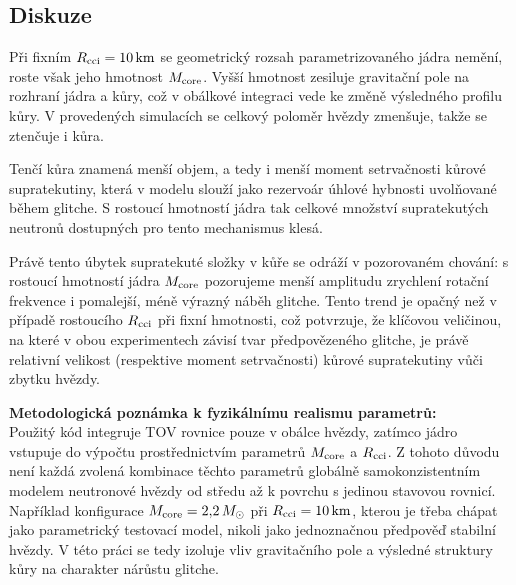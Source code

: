 \documentclass[%
final%
,htext%
]{ipothes}
\begin{document}
\begin{table}[H]
\centering \renewcommand{\arraystretch}{1.4}
\caption{Výsledky simulace ($R_{\rm cci} = 10$~km, proměnné $M_{\rm core}$). Veličiny: $M_{\rm core}$ -- hmotnost jádra; $M_{\rm NS}$, $R_{\rm NS}$ -- celková hmotnost a poloměr hvězdy; $\Delta\nu_{\rm max}$ -- přechodné maximum změny frekvence; $t_{\rm max}$ -- čas dosažení maxima; indexy A, B, C označují zvolený profil tření.}
\label{tab:exp2_mcoeff}
\newsavebox{\tabletwobox}
\sbox{\tabletwobox}{}
\resizebox{\textwidth}{!}{\usebox{\tabletwobox}}
\end{table}


\subsection{Diskuze}

Při fixním $R_{\rm cci} = 10\,\mathrm{km}$ se geometrický rozsah parametrizovaného jádra nemění, roste však jeho hmotnost $M_{\rm core}$. Vyšší hmotnost zesiluje gravitační pole na rozhraní jádra a kůry, což v obálkové integraci vede ke změně výsledného profilu kůry. V provedených simulacích se celkový poloměr hvězdy zmenšuje, takže se ztenčuje i kůra.

Tenčí kůra znamená menší objem, a tedy i menší moment setrvačnosti kůrové supratekutiny, která v modelu slouží jako rezervoár úhlové hybnosti uvolňované během glitche. S rostoucí hmotností jádra tak celkové množství supratekutých neutronů dostupných pro tento mechanismus klesá.

Právě tento úbytek supratekuté složky v kůře se odráží v pozorovaném chování: s rostoucí hmotností jádra $M_{\rm core}$ pozorujeme menší amplitudu zrychlení rotační frekvence i pomalejší, méně výrazný náběh glitche. Tento trend je opačný než v případě rostoucího $R_{\rm cci}$ při fixní hmotnosti, což potvrzuje, že klíčovou veličinou, na které v obou experimentech závisí tvar předpovězeného glitche, je právě relativní velikost (respektive moment setrvačnosti) kůrové supratekutiny vůči zbytku hvězdy.

\clearpage
\noindent\textbf{Metodologická poznámka k fyzikálnímu realismu parametrů:}\\
Použitý kód integruje TOV rovnice pouze v obálce hvězdy, zatímco jádro vstupuje do výpočtu prostřednictvím parametrů $M_{\rm core}$ a $R_{\rm cci}$. Z tohoto důvodu není každá zvolená kombinace těchto parametrů globálně samokonzistentním modelem neutronové hvězdy od středu až k povrchu s jedinou stavovou rovnicí. Například konfigurace $M_{\rm core}=2{,}2\,M_{\odot}$ při $R_{\rm cci}=10\,\mathrm{km}$, kterou je třeba chápat jako parametrický testovací model, nikoli jako jednoznačnou předpověď stabilní hvězdy. V této práci se tedy izoluje vliv gravitačního pole a výsledné struktury kůry na charakter nárůstu glitche.
\end{document}

